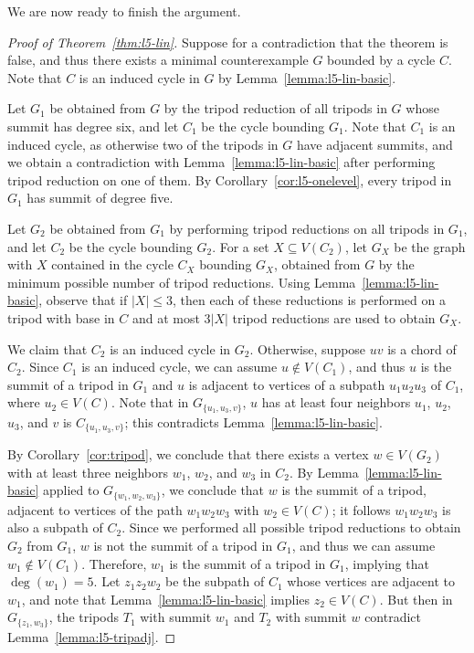 \documentclass[12pt,twoside,openright,a4paper]{book}
\begin{document}
We are now ready to finish the argument.
\begin{proof}[Proof of Theorem~\ref{thm:l5-lin}]
Suppose for a contradiction that the theorem is false, and thus there exists a minimal counterexample $G$ bounded by a cycle $C$.
Note that $C$ is an induced cycle in $G$ by Lemma~\ref{lemma:l5-lin-basic}.

Let $G_1$ be obtained from $G$ by the tripod reduction of all tripods in $G$ whose summit has degree six, and let $C_1$ be the cycle
bounding $G_1$.  Note that $C_1$ is an induced cycle, as otherwise two of the tripods in $G$ have adjacent summits, and we obtain
a contradiction with Lemma~\ref{lemma:l5-lin-basic} after performing tripod reduction on one of them.
By Corollary~\ref{cor:l5-onelevel}, every tripod in $G_1$ has summit of degree five.

Let $G_2$ be obtained from $G_1$ by performing tripod reductions on all tripods in $G_1$, and let $C_2$ be the cycle bounding $G_2$.
For a set $X\subseteq V(C_2)$, let $G_X$ be the graph with $X$ contained in the cycle $C_X$ bounding $G_X$,
obtained from $G$ by the minimum possible number of tripod reductions.  Using Lemma~\ref{lemma:l5-lin-basic}, observe that
if $|X|\le 3$, then each of these reductions is performed on a tripod with base in $C$ and at most $3|X|$ tripod reductions
are used to obtain $G_X$.

We claim that $C_2$ is an induced cycle in $G_2$.  Otherwise, suppose $uv$ is a chord of $C_2$.  Since $C_1$ is an induced cycle,
we can assume $u\not\in V(C_1)$, and thus $u$ is the summit of a tripod in $G_1$ and $u$ is adjacent to vertices of a subpath $u_1u_2u_3$ of $C_1$,
where $u_2\in V(C)$.  Note that in $G_{\{u_1,u_3,v\}}$, $u$ has at least four neighbors $u_1$, $u_2$, $u_3$, and $v$ is
$C_{\{u_1,u_3,v\}}$; this contradicts Lemma~\ref{lemma:l5-lin-basic}.

By Corollary~\ref{cor:tripod}, we conclude that there exists a vertex $w\in V(G_2)$ with at least three neighbors
$w_1$, $w_2$, and $w_3$ in $C_2$.  By Lemma~\ref{lemma:l5-lin-basic} applied to $G_{\{w_1,w_2,w_3\}}$,
we conclude that $w$ is the summit of a tripod, adjacent to vertices of the path $w_1w_2w_3$ with $w_2\in V(C)$;
it follows $w_1w_2w_3$ is also a subpath of $C_2$.  Since we performed all possible tripod reductions to obtain $G_2$ from $G_1$,
$w$ is not the summit of a tripod in $G_1$, and thus we can assume $w_1\not\in V(C_1)$.  Therefore,
$w_1$ is the summit of a tripod in $G_1$, implying that $\deg(w_1)=5$.  Let $z_1z_2w_2$ be the subpath of $C_1$ whose vertices
are adjacent to $w_1$, and note that Lemma~\ref{lemma:l5-lin-basic} implies $z_2\in V(C)$.  But then
in $G_{\{z_1,w_3\}}$, the tripods $T_1$ with summit $w_1$ and $T_2$ with summit $w$ contradict Lemma~\ref{lemma:l5-tripadj}.
\end{proof}
\end{document}
